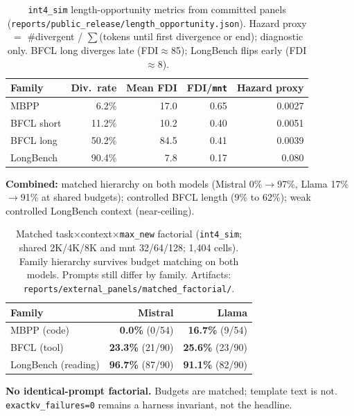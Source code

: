 \documentclass[11pt]{article}
\begin{document}
\begin{table}[htbp]
\centering\small\setlength\tabcolsep{4pt}
\renewcommand{\arraystretch}{1.05}
\begin{tabular}{lrrrr}
\toprule
\textbf{Family} & \textbf{Div.\ rate} & \textbf{Mean FDI} & \textbf{FDI/\texttt{mnt}} & \textbf{Hazard proxy} \\
\midrule
MBPP & 6.2\% & 17.0 & 0.65 & 0.0027 \\
BFCL short & 11.2\% & 10.2 & 0.40 & 0.0051 \\
BFCL long & 50.2\% & 84.5 & 0.41 & 0.0039 \\
LongBench & 90.4\% & 7.8 & 0.17 & 0.080 \\
\bottomrule
\end{tabular}
\caption{\texttt{int4\_sim} length-opportunity metrics from committed panels
(\texttt{reports/public\_release/length\_opportunity.json}).
Hazard proxy $=$ \#divergent / $\sum$(tokens until first divergence or end); diagnostic only.
BFCL long diverges late (FDI$\approx$85); LongBench flips early (FDI$\approx$8).}
\label{tab:length-opportunity}
\end{table}

\noindent\textbf{Combined:} matched hierarchy on both models (Mistral 0\%$\to$97\%,
Llama 17\%$\to$91\% at shared budgets); controlled BFCL length (9\% to 62\%);
weak controlled LongBench context (near-ceiling).

\begin{table}[htbp]
\centering\small\setlength\tabcolsep{4pt}
\renewcommand{\arraystretch}{1.05}
\begin{tabular}{lrr}
\toprule
\textbf{Family} & \textbf{Mistral} & \textbf{Llama} \\
\midrule
MBPP (code) & \textbf{0.0\%} (0/54) & \textbf{16.7\%} (9/54) \\
BFCL (tool) & \textbf{23.3\%} (21/90) & \textbf{25.6\%} (23/90) \\
LongBench (reading) & \textbf{96.7\%} (87/90) & \textbf{91.1\%} (82/90) \\
\bottomrule
\end{tabular}
\caption{Matched task$\times$context$\times$\texttt{max\_new} factorial
(\texttt{int4\_sim}; shared 2K/4K/8K and mnt 32/64/128; 1{,}404 cells).
Family hierarchy survives budget matching on both models.
Prompts still differ by family.
Artifacts: \texttt{reports/external\_panels/matched\_factorial/}.}
\label{tab:matched-factorial}
\end{table}

\begin{sloppypar}
\noindent\textbf{No identical-prompt factorial.} Budgets are matched; template text is not.
\texttt{exactkv\_failures=0} remains a harness invariant, not the headline.
\end{sloppypar}
\end{document}
